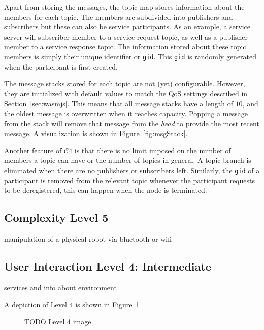         Apart from storing the messages, the topic map stores information about the members for each topic. The members are subdivided into publishers and subscribers but these can also be service participants. As an example, a service server will subscriber member to a service request topic, as well as a publisher member to a service response topic. The information stored about these topic members is simply their unique identifier or \texttt{gid}. This \texttt{gid} is randomly generated when the participant is first created. 

        The message stacks stored for each topic are not (yet) configurable. However, they are initialized with default values to match the \ac{QoS} settings described in Section~\ref{sec:wasmjs}. This means that all message stacks have a length of $10$, and the oldest message is overwritten when it reaches capacity. Popping a message from the stack will remove that message from the \textit{head} to provide the most recent message. A visualization is shown in Figure~\ref{fig:msgStack}.

        Another feature of $\mathcal{C}4$ is that there is no limit imposed on the number of members a topic can have or the number of topics in general. A topic branch is eliminated when there are no publishers or subscribers left. Similarly, the \texttt{gid} of a participant is removed from the relevant topic whenever the participant requests to be deregistered, this can happen when the node is terminated. 


        \subsection{Complexity Level 5}

        manipulation of a physical robot via bluetooth or wifi


        \subsection{User Interaction Level 4: Intermediate}

        services and info about environment











        A depiction of Level 4 is shown in Figure~\ref{fig:ui4}

        \begin{figure}[htbp]
            \centering
            \caption{TODO Level 4 image}\label{fig:ui4}
        \end{figure}

